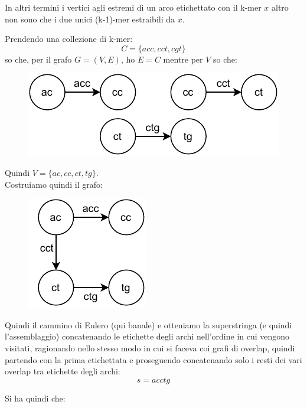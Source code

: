 \documentclass[a4paper,12pt, oneside]{book}
\begin{document}
In altri termini i vertici agli estremi di un arco etichettato con il k-mer $x$
altro non sono che i due unici (k-1)-mer estraibili da $x$. 
\begin{esempio}
  Prendendo una collezione di k-mer:
  \[C=\{acc,cct,cgt\}\]
  so che, per il grafo $G=(V,E)$, ho $E=C$ mentre per $V$ so che:
  \begin{figure}[H]
    \centering
    \includegraphics[scale = 1]{img/gra5.pdf}
  \end{figure}
  Quindi $V=\{ac,cc,ct,tg\}$.\\
  Costruiamo quindi il grafo:
  \begin{figure}[H]
    \centering
    \includegraphics[scale = 1]{img/gra6.pdf}
  \end{figure}
  Quindi il cammino di Eulero (qui banale) e otteniamo la superstringa (e quindi
  l'assemblaggio)
  concatenando le etichette degli archi nell'ordine in cui vengono visitati,
  ragionando nello stesso modo in cui si faceva coi grafi di overlap, quindi
  partendo con la prima etichettata e proseguendo concatenando solo i resti dei
  vari overlap tra etichette degli archi:
  \[s=acctg\]
\end{esempio}
Si ha quindi che:
\end{document}
